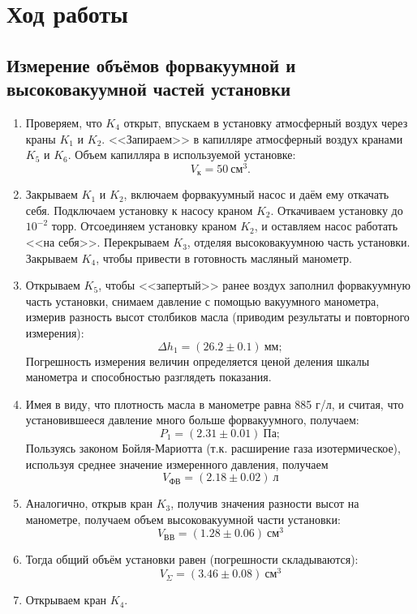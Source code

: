 \documentclass[a4paper,12pt]{article} %
\begin{document}
\section{Ход работы}

\subsection*{Измерение объёмов форвакуумной и высоковакуумной частей установки}
	\begin{enumerate}
		\item Проверяем, что $K_4$ открыт, впускаем в установку атмосферный воздух через краны $K_1$ и $K_2$. <<Запираем>> в капилляре атмосферный воздух кранами $K_5$ и $K_6$. Объем капилляра в используемой установке: $$V_\text{к} = 50~ \text{см}^3.$$
		\item Закрываем $K_1$ и $K_2$, включаем форвакуумный насос и даём ему откачать себя. Подключаем установку к насосу краном $K_2$. Откачиваем установку до $10^{-2}$ торр. Отсоединяем установку краном $K_2$, и оставляем насос работать <<на себя>>. Перекрываем  $K_3$, отделяя высоковакуумною часть установки. Закрываем  $K_4$, чтобы привести в готовность масляный манометр.
		\item Открываем  $K_5$, чтобы <<запертый>> ранее воздух заполнил форвакуумную часть установки, снимаем давление с помощью вакуумного манометра, измерив разность высот столбиков масла (приводим результаты и повторного измерения):
		$$
		\Delta h_1 = (26.2\pm0.1) ~\text{мм};
		$$
		Погрешность измерения величин определяется ценой деления шкалы манометра и способностью разглядеть показания.
		\item Имея в виду, что плотность масла в манометре равна 885 г/л, и считая, что установившееся давление много больше форвакуумного, получаем:
		$$
		P_1 = (2.31\pm0.01)~\text{Па};
		$$
		Пользуясь законом Бойля-Мариотта (т.к. расширение газа изотермическое), используя среднее значение измеренного давления, получаем
		$$
		V_\text{ФВ} = (2.18\pm0.02)~\text{л}
		$$
		\item Аналогично, открыв кран $K_3$, получив значения разности высот на манометре, получаем объем высоковакуумной части установки:
		$$
		V_\text{ВВ} = (1.28\pm0.06)~\text{см}^3
		$$
            \item Тогда общий объём установки равен (погрешности складываются):
            $$
		V_\Sigma = (3.46\pm0.08)~\text{см}^3
		$$
		\item Открываем кран $K_4$.
	\end{enumerate}
\end{document}
